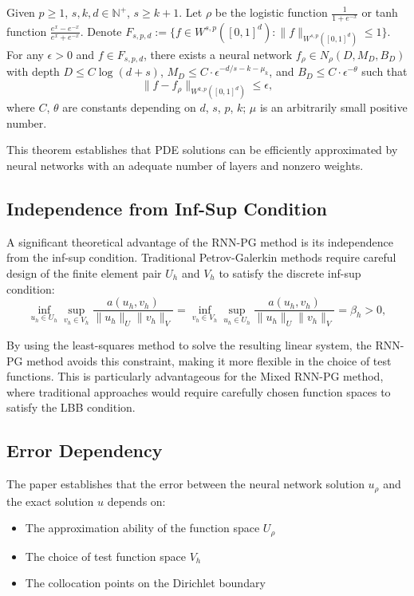 \documentclass[11pt,a4paper]{article}
\begin{document}
\begin{theorem}
Given $p \geq 1$, $s,k,d \in \mathbb{N}^+$, $s \geq k+1$. Let $\rho$ be the logistic function $\frac{1}{1+e^{-x}}$ or tanh function $\frac{e^x - e^{-x}}{e^x + e^{-x}}$. Denote $F_{s,p,d} := \{f \in W^{s,p}([0,1]^d): \|f\|_{W^{s,p}([0,1]^d)} \leq 1\}$. For any $\epsilon > 0$ and $f \in F_{s,p,d}$, there exists a neural network $f_\rho \in N_\rho(D, M_D, B_D)$ with depth $D \leq C\log(d+s)$, $M_D \leq C \cdot \epsilon^{-d/s-k-\mu_k}$, and $B_D \leq C \cdot \epsilon^{-\theta}$ such that
\begin{equation}
\|f - f_\rho\|_{W^{k,p}([0,1]^d)} \leq \epsilon,
\end{equation}
where $C$, $\theta$ are constants depending on $d$, $s$, $p$, $k$; $\mu$ is an arbitrarily small positive number.
\end{theorem}

This theorem establishes that PDE solutions can be efficiently approximated by neural networks with an adequate number of layers and nonzero weights.

\subsection{Independence from Inf-Sup Condition}

A significant theoretical advantage of the RNN-PG method is its independence from the inf-sup condition. Traditional Petrov-Galerkin methods require careful design of the finite element pair $U_h$ and $V_h$ to satisfy the discrete inf-sup condition:
\begin{equation}
\inf_{u_h \in U_h} \sup_{v_h \in V_h} \frac{a(u_h, v_h)}{\|u_h\|_U \|v_h\|_V} = \inf_{v_h \in V_h} \sup_{u_h \in U_h} \frac{a(u_h, v_h)}{\|u_h\|_U \|v_h\|_V} = \beta_h > 0,
\end{equation}

By using the least-squares method to solve the resulting linear system, the RNN-PG method avoids this constraint, making it more flexible in the choice of test functions. This is particularly advantageous for the Mixed RNN-PG method, where traditional approaches would require carefully chosen function spaces to satisfy the LBB condition.

\subsection{Error Dependency}

The paper establishes that the error between the neural network solution $u_\rho$ and the exact solution $u$ depends on:
\begin{itemize}
    \item The approximation ability of the function space $U_\rho$
    \item The choice of test function space $V_h$
    \item The collocation points on the Dirichlet boundary
\end{itemize}
\end{document}
